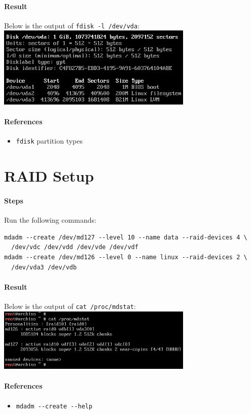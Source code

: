 \documentclass[12pt, a4paper]{article}
\begin{document}
  \paragraph{Result}
   Below is the output of \verb|fdisk -l /dev/vda|:\\[1.5ex]
   \includegraphics[width=0.7\textwidth]{1_result.png}
  \paragraph{References}
  \begin{itemize}
    \item \verb|fdisk| partition types
  \end{itemize}

  \section{RAID Setup}
  \paragraph{Steps}
    Run the following commands:
    \begin{verbatim}
mdadm --create /dev/md127 --level 10 --name data --raid-devices 4 \
  /dev/vdc /dev/vdd /dev/vde /dev/vdf
mdadm --create /dev/md126 --level 0 --name linux --raid-devices 2 \
  /dev/vda3 /dev/vdb\end{verbatim}
  \paragraph{Result}
  Below is the output of \verb|cat /proc/mdstat|:\\[1.5ex]
  \includegraphics[width=0.7\textwidth]{2_result.png}
  \paragraph{References}
  \begin{itemize}
    \item \verb|mdadm --create --help|
  \end{itemize}
\end{document}
